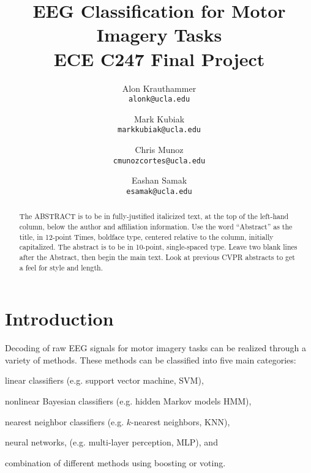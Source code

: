 \documentclass[10pt,twocolumn,letterpaper]{article}
\begin{document}
\title{
    EEG Classification for Motor Imagery Tasks\\
    {\large ECE C247 Final Project}
}

\author{Alon Krauthammer\\
{\tt\small alonk@ucla.edu}
\and
Mark Kubiak\\
{\tt\small markkubiak@ucla.edu}
\and
Chris Munoz\\
{\tt\small cmunozcortes@ucla.edu}
\and
Eashan Samak\\
{\tt\small esamak@ucla.edu}
}

\maketitle

\begin{abstract}
   The ABSTRACT is to be in fully-justified italicized text, at the top
   of the left-hand column, below the author and affiliation
   information. Use the word ``Abstract'' as the title, in 12-point
   Times, boldface type, centered relative to the column, initially
   capitalized. The abstract is to be in 10-point, single-spaced type.
   Leave two blank lines after the Abstract, then begin the main text.
   Look at previous CVPR abstracts to get a feel for style and length.
\end{abstract}

\section{Introduction}
Decoding of raw EEG signals for motor imagery tasks can be realized through a
variety of methods. These methods can be classified into five main categories:
\begin{enumerate*}
    \item linear classifiers (e.g. support vector machine, SVM),
    \item nonlinear Bayesian classifiers (e.g. hidden Markov models HMM),
    \item nearest neighbor classifiers (e.g. $k$-nearest neighbors, KNN),
    \item neural networks, (e.g. multi-layer perception, MLP), and
    \item combination of different methods using boosting or voting.
\end{enumerate*} \cite{wang}
\end{document}
